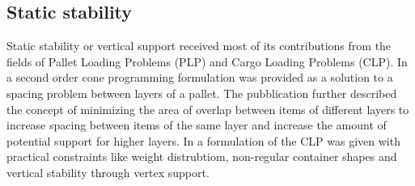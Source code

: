 \subsection*{Static stability}
Static stability or vertical support received most of its contributions from the fields of Pallet Loading Problems (PLP) and Cargo Loading Problems (CLP). In \citep{elhedhli2019three} a second order cone programming formulation was provided as a solution to a spacing problem between layers of a pallet. The pubblication further described the concept of minimizing the area of overlap between items of different layers to increase spacing between items of the same layer and increase the amount of potential support for higher layers.
In \citep{paquay2016mixed} a formulation of the CLP was given with practical constraints like weight distrubtiom, non-regular container shapes and vertical stability through vertex support.